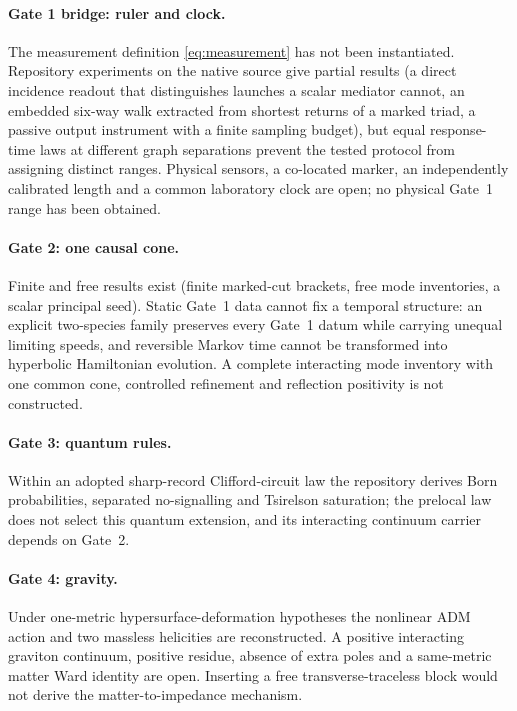 \documentclass[11pt]{article}
\theoremstyle{definition}
\theoremstyle{remark}
\begin{document}
\paragraph{Gate 1 bridge: ruler and clock.} The measurement definition
\eqref{eq:measurement} has not been instantiated. Repository experiments on the native
source give partial results (a direct incidence readout that distinguishes launches a
scalar mediator cannot, an embedded six-way walk extracted from shortest returns of a
marked triad, a passive output instrument with a finite sampling budget), but equal
response-time laws at different graph separations prevent the tested protocol from
assigning distinct ranges. Physical sensors, a co-located marker, an independently
calibrated length and a common laboratory clock are open; no physical Gate~1 range has
been obtained.

\paragraph{Gate 2: one causal cone.} Finite and free results exist (finite marked-cut
brackets, free mode inventories, a scalar principal seed). Static Gate~1 data cannot fix
a temporal structure: an explicit two-species family preserves every Gate~1 datum while
carrying unequal limiting speeds, and reversible Markov time cannot be transformed into
hyperbolic Hamiltonian evolution. A complete interacting mode inventory with one common
cone, controlled refinement and reflection positivity is not constructed.

\paragraph{Gate 3: quantum rules.} Within an adopted sharp-record Clifford-circuit law
the repository derives Born probabilities, separated no-signalling and Tsirelson
saturation; the prelocal law does not select this quantum extension, and its interacting
continuum carrier depends on Gate~2.

\paragraph{Gate 4: gravity.} Under one-metric hypersurface-deformation hypotheses the
nonlinear ADM action and two massless helicities are reconstructed. A positive
interacting graviton continuum, positive residue, absence of extra poles and a
same-metric matter Ward identity are open. Inserting a free transverse-traceless block
would not derive the matter-to-impedance mechanism.
\end{document}
